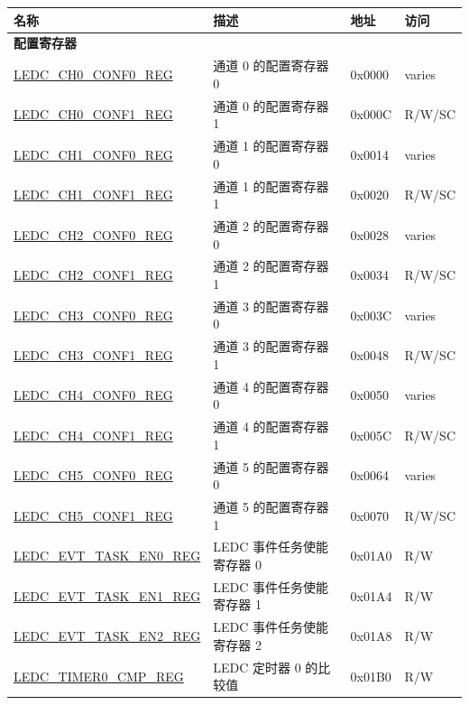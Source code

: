 \begin{longtable}{ | p{6cm} | p{7.2cm} | p{1.3cm} | p{1cm} | }
\hline\rowcolor{lightgray}
名称 & 描述 &  地址 & 访问 \\ \hline
\endhead
\multicolumn{4}{|l|}{\textbf{配置寄存器}} \\ \hline
\hyperref[regdesc:LEDCCHNCONF0REG]{LEDC\_CH0\_CONF0\_REG} & 通道 0 的配置寄存器 0 & 0x0000 & varies \\ \hline
\hyperref[regdesc:LEDCCHNCONF1REG]{LEDC\_CH0\_CONF1\_REG} & 通道 0 的配置寄存器 1 & 0x000C & R/W/SC \\ \hline
\hyperref[regdesc:LEDCCHNCONF0REG]{LEDC\_CH1\_CONF0\_REG} & 通道 1 的配置寄存器 0 & 0x0014 & varies \\ \hline
\hyperref[regdesc:LEDCCHNCONF1REG]{LEDC\_CH1\_CONF1\_REG} & 通道 1 的配置寄存器 1 & 0x0020 & R/W/SC \\ \hline
\hyperref[regdesc:LEDCCHNCONF0REG]{LEDC\_CH2\_CONF0\_REG} & 通道 2 的配置寄存器 0 & 0x0028 & varies \\ \hline
\hyperref[regdesc:LEDCCHNCONF1REG]{LEDC\_CH2\_CONF1\_REG} & 通道 2 的配置寄存器 1 & 0x0034 & R/W/SC \\ \hline
\hyperref[regdesc:LEDCCHNCONF0REG]{LEDC\_CH3\_CONF0\_REG} & 通道 3 的配置寄存器 0 & 0x003C & varies \\ \hline
\hyperref[regdesc:LEDCCHNCONF1REG]{LEDC\_CH3\_CONF1\_REG} & 通道 3 的配置寄存器 1 & 0x0048 & R/W/SC \\ \hline
\hyperref[regdesc:LEDCCHNCONF0REG]{LEDC\_CH4\_CONF0\_REG} & 通道 4 的配置寄存器 0 & 0x0050 & varies \\ \hline
\hyperref[regdesc:LEDCCHNCONF1REG]{LEDC\_CH4\_CONF1\_REG} & 通道 4 的配置寄存器 1 & 0x005C & R/W/SC \\ \hline
\hyperref[regdesc:LEDCCHNCONF0REG]{LEDC\_CH5\_CONF0\_REG} & 通道 5 的配置寄存器 0 & 0x0064 & varies \\ \hline
\hyperref[regdesc:LEDCCHNCONF1REG]{LEDC\_CH5\_CONF1\_REG} & 通道 5 的配置寄存器 1 & 0x0070 & R/W/SC \\ \hline
\hyperref[regdesc:LEDCEVTTASKEN0REG]{LEDC\_EVT\_TASK\_EN0\_REG} & LEDC 事件任务使能寄存器 0 & 0x01A0 & R/W \\ \hline
\hyperref[regdesc:LEDCEVTTASKEN1REG]{LEDC\_EVT\_TASK\_EN1\_REG} & LEDC 事件任务使能寄存器 1 & 0x01A4 & R/W \\ \hline
\hyperref[regdesc:LEDCEVTTASKEN2REG]{LEDC\_EVT\_TASK\_EN2\_REG} & LEDC 事件任务使能寄存器 2 & 0x01A8 & R/W \\ \hline
\hyperref[regdesc:LEDCTIMERXCMPREG]{LEDC\_TIMER0\_CMP\_REG} & LEDC 定时器 0 的比较值 & 0x01B0 & R/W \\ \hline

\end{longtable}
